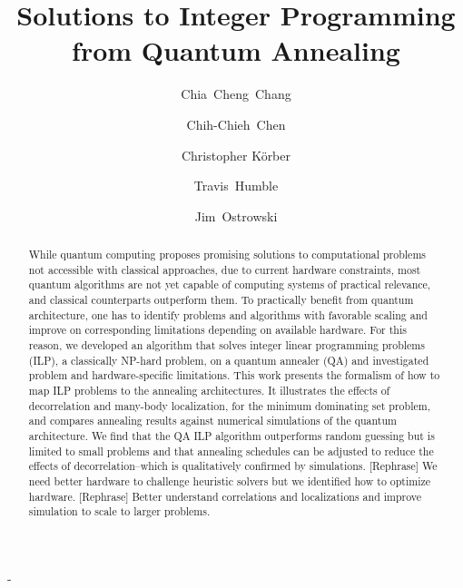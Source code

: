 -\documentclass[prd,twocolumn,tightenlines,preprintnumbers,showpacs,superscriptaddress,notitlepage,nofootinbib,eqsecnum,floatfix,longbibliography]{revtex4}
\begin{document}
\title{Solutions to Integer Programming from Quantum Annealing}

\author{Chia~Cheng~Chang}
\author{Chih-Chieh~Chen}
\author{Christopher K\"orber}
\author{Travis~Humble}
\author{Jim~Ostrowski}

\begin{abstract}
While quantum computing proposes promising solutions to computational problems not accessible with classical approaches, due to current hardware constraints, most quantum algorithms are not yet capable of computing systems of practical relevance, and classical counterparts outperform them.
To practically benefit from quantum architecture, one has to identify problems and algorithms with favorable scaling and improve on corresponding limitations depending on available hardware.
For this reason, we developed an algorithm that solves integer linear programming problems (ILP), a classically NP-hard problem, on a quantum annealer (QA) and investigated problem and hardware-specific limitations.
This work presents the formalism of how to map ILP problems to the annealing architectures.
It illustrates the effects of decorrelation and many-body localization, for the minimum dominating set problem, and compares annealing results against numerical simulations of the quantum architecture.
We find that the QA ILP algorithm outperforms random guessing but is limited to small problems and that annealing schedules can be adjusted to reduce the effects of decorrelation--which is qualitatively confirmed by simulations.
[Rephrase] We need better hardware to challenge heuristic solvers but we identified how to optimize hardware.
[Rephrase] Better understand correlations and localizations and improve simulation to scale to larger problems.

\end{abstract}
\end{document}

